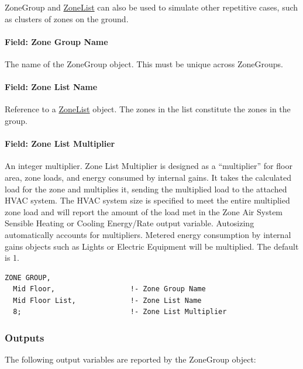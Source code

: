 ZoneGroup and \hyperref[zonelist]{ZoneList} can also be used to simulate other repetitive cases, such as clusters of zones on the ground.

\paragraph{Field: Zone Group Name}\label{field-zone-group-name}

The name of the ZoneGroup object. This must be unique across ZoneGroups.

\paragraph{Field: Zone List Name}\label{field-zone-list-name-1}

Reference to a \hyperref[zonelist]{ZoneList} object. The zones in the list constitute the zones in the group.

\paragraph{Field: Zone List Multiplier}\label{field-zone-list-multiplier}

An integer multiplier. Zone List Multiplier is designed as a ``multiplier'' for floor area, zone loads, and energy consumed by internal gains. It takes the calculated load for the zone and multiplies it, sending the multiplied load to the attached HVAC system. The HVAC system size is specified to meet the entire multiplied zone load and will report the amount of the load met in the Zone Air System Sensible Heating or Cooling Energy/Rate output variable. Autosizing automatically accounts for multipliers. Metered energy consumption by internal gains objects such as Lights or Electric Equipment will be multiplied. The default is 1.

\begin{lstlisting}
ZONE GROUP,
  Mid Floor,                  !- Zone Group Name
  Mid Floor List,             !- Zone List Name
  8;                          !- Zone List Multiplier
\end{lstlisting}

\subsubsection{Outputs}\label{outputs-2-023}

The following output variables are reported by the ZoneGroup object:

